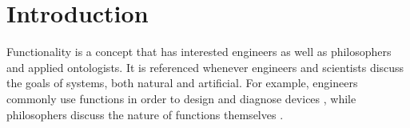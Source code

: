 \documentclass[sw]{iosart2x}
\begin{document}


\section{Introduction}\label{sec:intro}

Functionality is a concept that has interested engineers as well as philosophers and applied ontologists. 
It is referenced whenever engineers and scientists discuss the goals of systems, both natural and artificial.%
For example, engineers commonly use functions in order to design \cite{pahl_engineering_2007} and diagnose devices \cite{larssonDiagnosisBasedExplicit1996}, while philosophers discuss the nature of functions themselves \cite{cumminsFunctionalAnalysis1975}.
\end{document}
